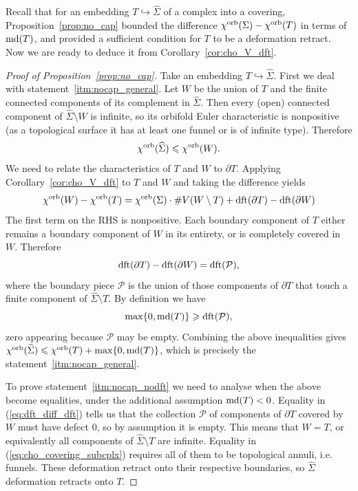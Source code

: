 \documentclass{amsart}
\newcommand{\cho}{\chi^{\textnormal{orb}}}
\newcommand{\dft}{\textnormal{dft}}
\newcommand{\md}{\textnormal{md}}
\newcommand{\whS}{{\widehat{\Sigma}}}
\begin{document}
Recall that for an embedding $T\hookrightarrow\whS$ of a complex into a covering, Proposition~\ref{prop:no_cap} bounded the difference $\cho(\Sigma)-\cho(T)$ in terms of $\md(T)$, and provided a sufficient condition for $T$ to be a deformation retract. Now we are ready to deduce it from Corollary~\ref{cor:cho_V_dft}.
\begin{proof}[Proof of Proposition~\ref{prop:no_cap}]
Take an embedding $T\hookrightarrow\whS$. First we deal with statement~\ref*{itm:nocap_general}. Let $W$ be the union of $T$ and the finite connected components of its complement in $\whS$. Then every (open) connected component of $\whS\setminus W$ is infinite, so its orbifold Euler characteristic is nonpositive (as a topological surface it has at least one funnel or is of infinite type). Therefore
\begin{equation}\label{eq:cho_covering_subcplx}
\cho(\whS)\leqslant\cho(W).
\end{equation}
We need to relate the characteristics of $T$ and $W$ to $\partial T$. Applying Corollary~\ref{cor:cho_V_dft} to $T$ and $W$ and taking the difference yields
\begin{equation*}
\cho(W)-\cho(T)=\cho(\Sigma)\cdot\#V(W\setminus T)+\dft(\partial T)-\dft(\partial W)
\end{equation*}
The first term on the RHS is nonpositive. Each boundary component of $T$ either remains a boundary component of $W$ in its entirety, or is completely covered in $W$. Therefore
\begin{equation*}
\dft(\partial T)-\dft(\partial W)=\dft(\mathcal{P}),
\end{equation*}
where the boundary piece $\mathcal{P}$ is the union of those components of $\partial T$ that touch a finite component of $\whS\setminus T$. By definition we have
\begin{equation}\label{eq:dft_diff_dft}
\max\{0,\md(T)\}\geqslant\dft(\mathcal{P}),
\end{equation}
zero appearing because $\mathcal{P}$ may be empty. Combining the above inequalities gives $\cho(\whS)\leqslant\cho(T)+\max\{0,\md(T)\}$, which is precisely the statement~\ref*{itm:nocap_general}.

To prove statement~\ref*{itm:nocap_nodft} we need to analyse when the above become equalities, under the additional assumption $\md(T)<0$. Equality in (\ref{eq:dft_diff_dft}) tells us that the collection $\mathcal{P}$ of components of $\partial T$ covered by $W$ must have defect 0, so by assumption it is empty. This means that $W=T$, or equivalently all components of $\whS\setminus T$ are infinite. Equality in (\ref{eq:cho_covering_subcplx}) requires all of them to be topological annuli, i.e. funnels. These deformation retract onto their respective boundaries, so $\whS$ deformation retracts onto $T$.
\end{proof}
\end{document}
